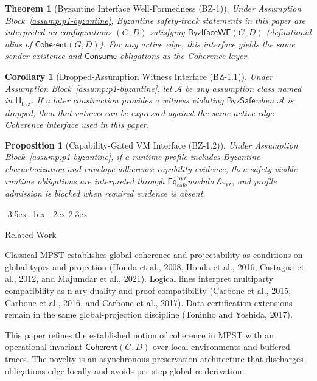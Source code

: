 \documentclass[a4paper,10pt,twocolumn,english]{article}
\makeatletter
\renewcommand{\section}{\@startsection{section}{1}{\z@}%
  {-3.5ex \@plus -1ex \@minus -.2ex}%
  {2.3ex}%
  {\raggedright\normalfont\large\bfseries}}
\numberwithin{equation}{section}
\theoremstyle{paperdef}
\theoremstyle{paperplain}
\newtheorem{theorem}[definition]{Theorem}
\newtheorem{proposition}[definition]{Proposition}
\newtheorem{corollary}[definition]{Corollary}
\theoremstyle{paperdef}
\theoremstyle{paperremark}
\newcommand{\Coherent}{\ensuremath{\mathsf{Coherent}}}
\newcommand{\Consume}{\ensuremath{\mathsf{Consume}}}
\newcommand{\Hbyz}{\ensuremath{\mathsf{H}_{\mathrm{byz}}}}
\newcommand{\Eqsafe}{\ensuremath{\mathsf{Eq}_{\mathrm{safe}}^{\mathrm{byz}}}}
\newcommand{\Ebyz}{\ensuremath{\mathcal{E}_{\mathrm{byz}}}}
\newcommand{\ByzSafe}{\ensuremath{\mathsf{ByzSafe}}}
\newcommand{\ByzIfaceWF}{\ensuremath{\mathsf{ByzIfaceWF}}}
\makeatother
\begin{document}
\begin{theorem}[Byzantine Interface Well-Formedness (BZ-1)]
	\label{thm:bz1}
	Under Assumption Block~\ref{assump:p1-byzantine}, Byzantine safety-track statements in this paper are interpreted on configurations $(G,D)$ satisfying $\ByzIfaceWF(G,D)$ (definitional alias of $\Coherent(G,D)$). For any active edge, this interface yields the same sender-existence and $\Consume$ obligations as the Coherence layer.
\end{theorem}

\begin{corollary}[Dropped-Assumption Witness Interface (BZ-1.1)]
	\label{cor:bz1-1}
	Under Assumption Block~\ref{assump:p1-byzantine}, let $\mathcal{A}$ be any assumption class named in \Hbyz. If a later construction provides a witness violating \ByzSafe when $\mathcal{A}$ is dropped, then that witness can be expressed against the same active-edge Coherence interface used in this paper.
\end{corollary}

\begin{proposition}[Capability-Gated VM Interface (BZ-1.2)]
	\label{prop:bz1-2}
	Under Assumption Block~\ref{assump:p1-byzantine}, if a runtime profile includes Byzantine characterization and envelope-adherence capability evidence, then safety-visible runtime obligations are interpreted through \Eqsafe modulo \Ebyz, and profile admission is blocked when required evidence is absent.
\end{proposition}

\section{Related Work}
\label{sec:related}

Classical MPST establishes global coherence and projectability as conditions on global types and projection (Honda et al., 2008, Honda et al., 2016, Castagna et al., 2012, and Majumdar et al., 2021). Logical lines interpret multiparty compatibility as n-ary duality and proof compatibility (Carbone et al., 2015, Carbone et al., 2016, and Carbone et al., 2017). Data certification extensions remain in the same global-projection discipline (Toninho and Yoshida, 2017).

This paper refines the established notion of coherence in MPST with an operational invariant $\Coherent(G,D)$ over local environments and buffered traces. The novelty is an asynchronous preservation architecture that discharges obligations edge-locally and avoids per-step global re-derivation.
\end{document}
